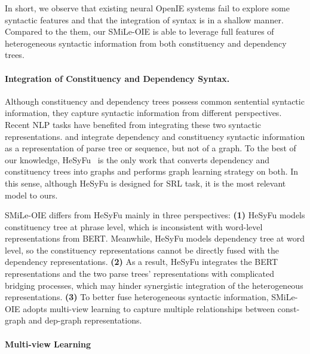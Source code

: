 \documentclass[11pt]{article}
\newcommand{\mname}{SMiLe-OIE\xspace}
\begin{document}
In short, we observe that existing neural OpenIE systems fail to explore some syntactic features and that the integration of syntax is in a shallow manner.
Compared to the them, our \mname is able to leverage full features of heterogeneous syntactic information from both constituency and dependency trees.


\paragraph{Integration of Constituency and Dependency Syntax.}
Although constituency and dependency trees possess common sentential syntactic information, they capture syntactic information from different perspectives. Recent NLP tasks have benefited from integrating these two syntactic representations.
\citet{zhou-zhao-2019-head} and \citet{strzyz-etal-2019-sequence} integrate dependency and constituency syntactic information as a representation of parse tree or sequence, but not of a graph.
To the best of our knowledge, HeSyFu~\cite{fei-etal-2021-better} is the only work that converts dependency and constituency trees into graphs and performs graph learning strategy on both.
In this sense, although HeSyFu is designed for SRL task, it is the most relevant model to ours. 


\mname differs from HeSyFu mainly in three perspectives:
\textbf{(1)} HeSyFu models constituency tree at phrase level, which is inconsistent with word-level representations from BERT. Meanwhile, HeSyFu models dependency tree at word level, so the constituency representations cannot be directly fused with the dependency representations. \textbf{(2)} As a result, HeSyFu integrates the BERT representations and the two parse trees' representations with complicated bridging processes, which may hinder synergistic integration of the heterogeneous representations.
\textbf{(3)} To better fuse heterogeneous syntactic information, \mname adopts multi-view learning to capture multiple relationships between const-graph and dep-graph representations.

\paragraph{Multi-view Learning}
\end{document}
